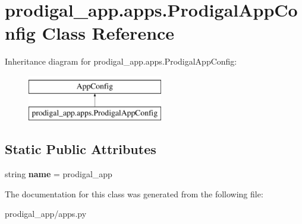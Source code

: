 \hypertarget{classprodigal__app_1_1apps_1_1_prodigal_app_config}{}\section{prodigal\+\_\+app.\+apps.\+Prodigal\+App\+Config Class Reference}
\label{classprodigal__app_1_1apps_1_1_prodigal_app_config}
Inheritance diagram for prodigal\+\_\+app.\+apps.\+Prodigal\+App\+Config\+:\begin{figure}[H]
\begin{center}
\leavevmode
\includegraphics[height=2.000000cm]{classprodigal__app_1_1apps_1_1_prodigal_app_config}
\end{center}
\end{figure}
\subsection*{Static Public Attributes}
\begin{DoxyCompactItemize}
\item 
\mbox{\label{classprodigal__app_1_1apps_1_1_prodigal_app_config_a0ba705766b61cb354368ff55c26e9991}} 
string {\bfseries name} = \textquotesingle{}prodigal\+\_\+app\textquotesingle{}
\end{DoxyCompactItemize}


The documentation for this class was generated from the following file\+:\begin{DoxyCompactItemize}
\item 
prodigal\+\_\+app/apps.\+py\end{DoxyCompactItemize}

